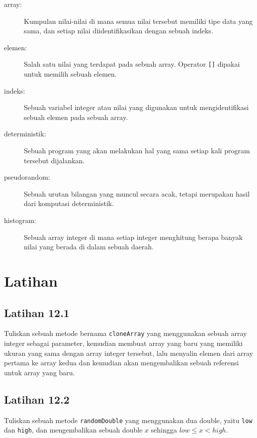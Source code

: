 \begin{description}

\item[array:]  Kumpulan nilai-nilai di mana semua nilai tersebut memiliki tipe data yang sama, dan setiap nilai diidentifikasikan dengan sebuah indeks.

\item[elemen:]  Salah satu nilai yang terdapat pada sebuah array. Operator {\tt []} dipakai untuk memilih sebuah elemen.

\item[indeks:]  Sebuah variabel integer atau nilai yang digunakan untuk mengidentifikasi sebuah elemen pada sebuah array.

\item[deterministik:]  Sebuah program yang akan melakukan hal yang sama setiap kali program tersebut dijalankan.

\item[pseudorandom:]  Sebuah urutan bilangan yang muncul secara acak, tetapi merupakan hasil dari komputasi deterministik.

\item[histogram:]  Sebuah array integer di mana setiap integer menghitung berapa banyak nilai yang berada di dalam sebuah daerah.


\end{description}


\section{Latihan}




\subsection{Latihan 12.1}
Tuliskan sebuah metode bernama {\tt cloneArray} yang menggunakan sebuah array integer sebagai parameter, kemudian membuat array yang baru yang memiliki ukuran yang sama dengan array integer tersebut, lalu menyalin elemen dari array pertama ke array kedua dan kemudian akan mengembalikan sebuah referensi untuk array yang baru.



\subsection{Latihan 12.2}
Tuliskan sebuah metode {\tt randomDouble} yang menggunakan dua double, yaitu
{\tt low} dan {\tt high}, dan mengembalikan sebuah double $x$
sehingga $low \le x < high$.



